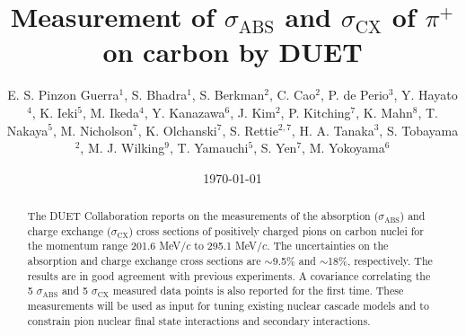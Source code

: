 \documentclass[%
 reprint,
showpacs,
 amsmath,amssymb,
 aps,
 prc,
]{revtex4-1}
\begin{document}
\title{Measurement of $\sigma_{\mathrm{ABS}}$ and $\sigma_{\mathrm{CX}}$ of $\pi^+$ on carbon by DUET}%

\author{E. S. Pinzon Guerra$^1$, S. Bhadra$^1$, S. Berkman$^2$, C. Cao$^2$, P. de Perio$^3$, Y. Hayato$^4$, K. Ieki$^5$, M. Ikeda$^4$, Y. Kanazawa$^6$,  J. Kim$^2$, P. Kitching$^7$, K. Mahn$^8$, T. Nakaya$^5$,  M. Nicholson$^7$, K. Olchanski$^7$, S. Rettie$^{2,7}$, H. A. Tanaka$^3$, S. Tobayama$^2$, M. J. Wilking$^9$, T. Yamauchi$^5$, S. Yen$^7$, M. Yokoyama$^6$}

%


\date{\today}%

\begin{abstract}

The DUET Collaboration reports on the measurements of the absorption {\color{red}($\sigma_{\mathrm{ABS}}$)} and charge exchange {\color{red}($\sigma_{\mathrm{CX}}$)} cross sections of positively charged pions on carbon nuclei for the momentum range 201.6 MeV$/c$ to 295.1 MeV$/c$. The uncertainties on the absorption and charge exchange cross sections are $\sim$9.5\% and $\sim$18\%, respectively. The results are in good agreement with previous experiments. A covariance correlating the 5 $\sigma_{\mathrm{ABS}}$ and 5 $\sigma_{\mathrm{CX}}$ measured data points is also reported for the first time. These measurements will be used as input for tuning existing nuclear cascade models and to constrain pion nuclear final state interactions and secondary interactions.

\end{abstract}
\end{document}

